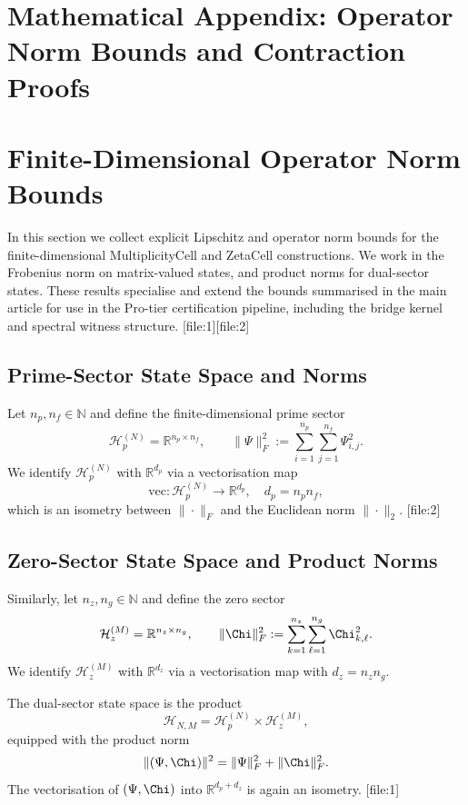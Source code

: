 \documentclass[11pt]{article}
\begin{document}
\appendix

\section*{Mathematical Appendix:
Operator Norm Bounds and Contraction Proofs}

\setcounter{section}{0}
\renewcommand\thesection{A.\arabic{section}}

\section{Finite-Dimensional Operator Norm Bounds}

In this section we collect explicit Lipschitz and operator norm bounds
for the finite-dimensional MultiplicityCell and ZetaCell constructions.
We work in the Frobenius norm on matrix-valued states, and product norms
for dual-sector states. These results specialise and extend the bounds
summarised in the main article for use in the Pro-tier certification
pipeline, including the bridge kernel and spectral witness structure.%
[file:1][file:2]

\subsection{Prime-Sector State Space and Norms}

Let $n_p,n_f \in \mathbb{N}$ and define the finite-dimensional prime
sector
\[
  \mathcal{H}_{p}^{(N)}
  = \mathbb{R}^{n_p \times n_f}, \qquad
  \|\Psi\|_F^2
  := \sum_{i=1}^{n_p}\sum_{j=1}^{n_f} \Psi_{i,j}^2.
\]
We identify $\mathcal{H}_{p}^{(N)}$ with $\mathbb{R}^{d_p}$ via a
vectorisation map
\[
  \mathrm{vec}: \mathcal{H}_{p}^{(N)} \to \mathbb{R}^{d_p}, \quad
  d_p = n_p n_f,
\]
which is an isometry between $\|\cdot\|_F$ and the Euclidean norm
$\|\cdot\|_2$.%
[file:2]

\subsection{Zero-Sector State Space and Product Norms}

Similarly, let $n_z,n_g \in \mathbb{N}$ and define the zero sector
\[
  \mathcal{H}_{z}^{(M)}
  = \mathbb{R}^{n_z \times n_g}, \qquad
  \|\Chi\|_F^2
  := \sum_{k=1}^{n_z}\sum_{\ell=1}^{n_g} \Chi_{k,\ell}^2.
\]
We identify $\mathcal{H}_{z}^{(M)}$ with $\mathbb{R}^{d_z}$ via a
vectorisation map with $d_z = n_z n_g$.

The dual-sector state space is the product
\[
  \mathcal{H}_{N,M} = \mathcal{H}_{p}^{(N)} \times \mathcal{H}_{z}^{(M)},
\]
equipped with the product norm
\[
  \|(\Psi,\Chi)\|^2 = \|\Psi\|_F^2 + \|\Chi\|_F^2.
\]
The vectorisation of $(\Psi,\Chi)$ into $\mathbb{R}^{d_p+d_z}$ is again
an isometry.%
[file:1]
\end{document}
